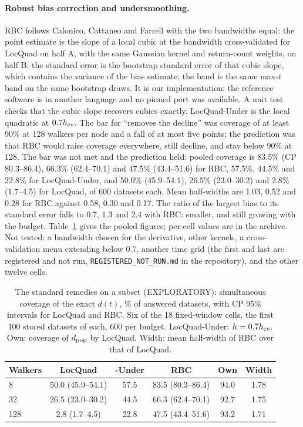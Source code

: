 \documentclass[aps,pre,twocolumn,superscriptaddress,nofootinbib,10pt]{revtex4-2}
\newcommand{\nm}[1]{\textsf{#1}}
\newcommand{\LQ}{\nm{LocQuad}}
\newcommand{\RBC}{\nm{RBC}}
\begin{document}
\paragraph*{Robust bias correction and undersmoothing.}
\textsf{RBC} follows Calonico, Cattaneo and Farrell \cite{ccf2018,ccf2022} with the two bandwidths equal: the point estimate is the slope of a local cubic at the bandwidth cross-validated for \textsf{LocQuad} on half A, with the same Gaussian kernel and return-count weights, on half B; the standard error is the bootstrap standard error of that cubic slope, which contains the variance of the bias estimate; the band is the same max-$t$ band on the same bootstrap draws. It is our implementation: the reference software is in another language and no pinned port was available. A unit test checks that the cubic slope recovers cubics exactly. \textsf{LocQuad-Under} is the local quadratic at $0.7h_{\rm cv}$. The bar for ``removes the decline'' was coverage of at least 90\% at 128 walkers per node and a fall of at most five points; the prediction was that \textsf{RBC} would raise coverage everywhere, still decline, and stay below 90\% at 128. The bar was not met and the prediction held: pooled coverage is 83.5\% (CP 80.3--86.4), 66.3\% (62.4--70.1) and 47.5\% (43.4--51.6) for \textsf{RBC}, 57.5\%, 44.5\% and 22.8\% for \textsf{LocQuad-Under}, and 50.0\% (45.9--54.1), 26.5\% (23.0--30.2) and 2.8\% (1.7--4.5) for \textsf{LocQuad}, of 600 datasets each. Mean half-widths are 1.03, 0.52 and 0.28 for \textsf{RBC} against 0.58, 0.30 and 0.17. The ratio of the largest bias to its standard error falls to 0.7, 1.3 and 2.4 with \textsf{RBC}: smaller, and still growing with the budget. Table~\ref{tab:rbc} gives the pooled figures; per-cell values are in the archive. Not tested: a bandwidth chosen for the derivative, other kernels, a cross-validation menu extending below 0.7, another time grid (the first and last are registered and not run, \texttt{REGISTERED\_NOT\_RUN.md} in the repository), and the other twelve cells.

\begin{table}[t]
\caption{The standard remedies on a subset (EXPLORATORY): simultaneous coverage of the exact $d(t)$, \% of answered datasets, with CP 95\% intervals for \LQ{} and \RBC{}. Six of the 18 fixed-window cells, the first 100 stored datasets of each, 600 per budget. \nm{LocQuad-Under}: $h=0.7h_{\rm cv}$. Own: coverage of $d_{\rm pop}$ by \LQ{}. Width: mean half-width of \RBC{} over that of \LQ{}.}
\label{tab:rbc}
\begin{ruledtabular}
\footnotesize
\setlength{\tabcolsep}{2pt}
\begin{tabular}{lccccc}
Walkers & \nm{LocQuad} & \nm{-Under} & \nm{RBC} & Own & Width \\
\hline
8   & 50.0 (45.9--54.1) & 57.5 & 83.5 (80.3--86.4) & 94.0 & 1.78 \\
32  & 26.5 (23.0--30.2) & 44.5 & 66.3 (62.4--70.1) & 92.7 & 1.75 \\
128 & 2.8 (1.7--4.5)    & 22.8 & 47.5 (43.4--51.6) & 93.2 & 1.71 \\
\end{tabular}
\end{ruledtabular}
\end{table}
\end{document}
